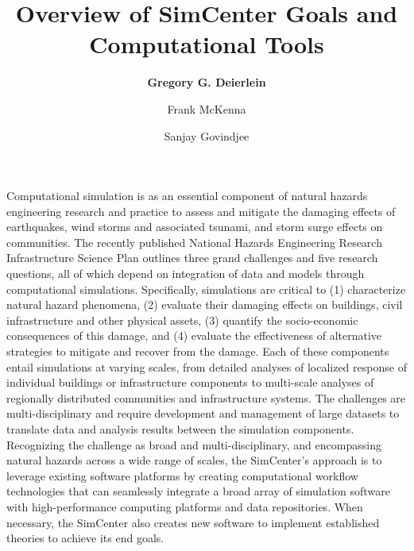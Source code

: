 %
%
%

\title{Overview of SimCenter Goals and Computational Tools}
\author{
    \textbf{Gregory G. Deierlein}
    \and Frank McKenna
    \and Sanjay Govindjee}
\tocauthor{}
%
%
\maketitle
\label{chapter:intro}

Computational simulation is as an essential component of natural hazards engineering research and practice to assess and mitigate the damaging effects of earthquakes, wind storms and associated tsunami, and storm surge effects on communities. The recently published National Hazards Engineering Research Infrastructure Science Plan \citep{edge2020natural} outlines three grand challenges and five research questions, all of which depend on integration of data and models through computational simulations.  Specifically, simulations are critical to (1) characterize natural hazard phenomena, (2) evaluate their damaging effects on buildings, civil infrastructure and other physical assets, (3) quantify the socio-economic consequences of this damage, and (4) evaluate the effectiveness of alternative strategies to mitigate and recover from the damage.  Each of these components entail simulations at varying scales, from detailed analyses of localized response of individual buildings or infrastructure components to multi-scale analyses of regionally distributed communities and infrastructure systems.  The challenges are multi-disciplinary and require development and management of large datasets to translate data and analysis results between the simulation components. Recognizing the challenge as broad and multi-disciplinary, and encompassing natural hazards across a wide range of scales, the SimCenter’s approach is to leverage existing software platforms by creating computational workflow technologies that can seamlessly integrate a broad array of simulation software with high-performance computing platforms and data repositories. When necessary, the SimCenter also creates new software to implement established theories to achieve its end goals.


